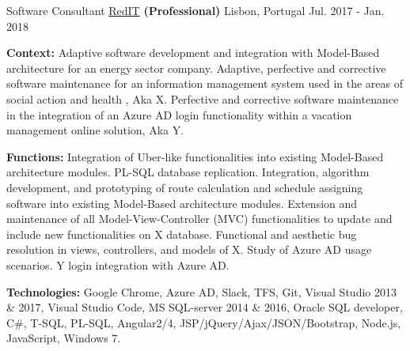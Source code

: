\begin{cventries}
  \cventry
    {Software Consultant} %
    {\href{https://www.reditpro.com/}{RedIT} \textbf{(Professional)}} %
    {Lisbon, Portugal} %
    {Jul. 2017 - Jan. 2018} 
    {
      \begin{cvitems} %
		\item[] {\textbf{Context:} 
Adaptive software development and integration with Model-Based architecture for an energy sector company. %
Adaptive, perfective and corrective software maintenance for an information management system used in the areas of social action and health%
, Aka X.
Perfective and corrective software maintenance in the integration of an Azure AD login functionality within a vacation management online solution, Aka Y.}
		\item[] {\textbf{Functions:} Integration of Uber-like functionalities into existing Model-Based architecture modules. PL-SQL database replication. Integration, algorithm development, and prototyping of route calculation and schedule assigning software into existing Model-Based architecture modules.
		Extension and maintenance of all Model-View-Controller (MVC) functionalities to update and include new functionalities on X database. Functional and aesthetic bug resolution in views, controllers, and models of X.
		Study of Azure AD usage scenarios. Y login integration with Azure AD.}		
		\item[] {\textbf{Technologies:} \textcolor{rainbowcolor-olive}{Google Chrome}, \textcolor{rainbowcolor-olive}{Azure AD}, \textcolor{rainbowcolor-olive}{Slack}, \textcolor{rainbowcolor-olive}{TFS}, \textcolor{rainbowcolor-olive}{Git}, \textcolor{rainbowcolor-olive}{Visual Studio 2013 \& 2017}, \textcolor{rainbowcolor-olive}{Visual Studio Code}, \textcolor{rainbowcolor-olive}{MS SQL-server 2014 \& 2016}, \textcolor{rainbowcolor-olive}{Oracle SQL developer}, \textcolor{rainbowcolor-indigo}{C\#}, \textcolor{rainbowcolor-indigo}{T-SQL}, \textcolor{rainbowcolor-indigo}{PL-SQL}, \textcolor{rainbowcolor-indigo}{Angular2/4}, \textcolor{rainbowcolor-indigo}{JSP/jQuery/Ajax/JSON/Bootstrap}, \textcolor{rainbowcolor-indigo}{Node.js}, \textcolor{rainbowcolor-indigo}{JavaScript}, \textcolor{rainbowcolor-orange}{Windows 7}.}	
      \end{cvitems}
    } 
    

\end{cventries}
